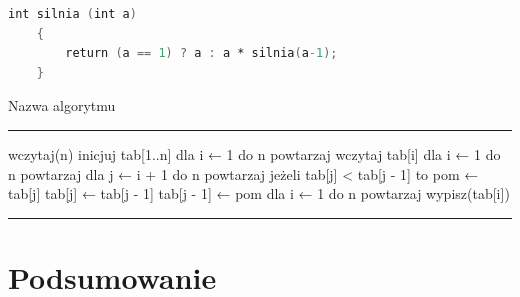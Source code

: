 \begin{lstlisting}[language=Verilog, caption=Nazwa kodu źródłowego \label{TbECMont}]
    int silnia (int a)
    {
        return (a == 1) ? a : a * silnia(a-1);
    }
\end{lstlisting}

\begin{algorithm}[H]
    \caption{Nazwa algorytmu}
    \label{alg_nazwa}
    \hrule
\begin{verbnobox}[\verbarg]
wczytaj(n)
inicjuj tab[1..n]
dla i ← 1 do n powtarzaj
    wczytaj tab[i]
dla i ← 1 do n powtarzaj
    dla j ← i + 1 do n powtarzaj
        jeżeli tab[j] < tab[j - 1] to
            pom ← tab[j]
            tab[j] ← tab[j - 1]
            tab[j - 1] ← pom
dla i ← 1 do n powtarzaj
    wypisz(tab[i])
\end{verbnobox}
    \hrule
\end{algorithm}

%
%
%
%
%

\clearpage \section*{Podsumowanie} 


